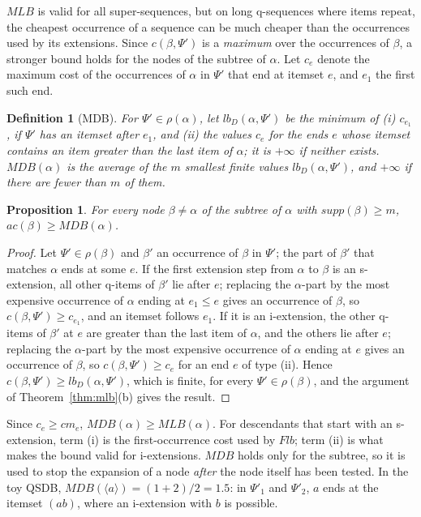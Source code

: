 \documentclass[pdflatex,sn-mathphys,Numbered]{sn-jnl}
\theoremstyle{thmstyleone}
\newtheorem{proposition}[theorem]{Proposition}
\theoremstyle{thmstyletwo}
\theoremstyle{thmstylethree}
\newtheorem{definition}{Definition}
\newcommand{\flb}{\ensuremath{\mathit{Flb}}}
\newcommand{\mlb}{\ensuremath{\mathit{MLB}}}
\newcommand{\mdb}{\ensuremath{\mathit{MDB}}}
\newcommand{\supp}{\ensuremath{\mathit{supp}}}
\newcommand{\ac}{\ensuremath{\mathit{ac}}}
\newcommand{\seq}[1]{\langle #1\rangle}
\begin{document}
\mlb{} is valid for all super-sequences, but on long q-sequences where items repeat, the
cheapest occurrence of a sequence can be much cheaper than the occurrences used by its
extensions. Since $c(\beta,\Psi')$ is a \emph{maximum} over the occurrences of $\beta$, a
stronger bound holds for the nodes of the subtree of $\alpha$. Let $c_e$ denote the maximum
cost of the occurrences of $\alpha$ in $\Psi'$ that end at itemset $e$, and $e_1$ the first such
end.

\begin{definition}[MDB]
For $\Psi' \in \rho(\alpha)$, let $\mathit{lb}_D(\alpha,\Psi')$ be the minimum of (i) $c_{e_1}$, if
$\Psi'$ has an itemset after $e_1$, and (ii) the values $c_e$ for the ends $e$ whose itemset
contains an item greater than the last item of $\alpha$; it is $+\infty$ if neither exists.
$\mdb(\alpha)$ is the average of the $m$ smallest finite values $\mathit{lb}_D(\alpha,\Psi')$,
and $+\infty$ if there are fewer than $m$ of them.
\end{definition}

\begin{proposition}\label{prop:mdb}
For every node $\beta \ne \alpha$ of the subtree of $\alpha$ with $\supp(\beta) \ge m$,
$\ac(\beta) \ge \mdb(\alpha)$.
\end{proposition}
\begin{proof}
Let $\Psi' \in \rho(\beta)$ and $\beta'$ an occurrence of $\beta$ in $\Psi'$; the part of $\beta'$
that matches $\alpha$ ends at some $e$. If the first extension step from $\alpha$ to $\beta$ is an
s-extension, all other q-items of $\beta'$ lie after $e$; replacing the $\alpha$-part by the most
expensive occurrence of $\alpha$ ending at $e_1 \le e$ gives an occurrence of $\beta$, so
$c(\beta,\Psi') \ge c_{e_1}$, and an itemset follows $e_1$. If it is an i-extension, the other
q-items of $\beta'$ at $e$ are greater than the last item of $\alpha$, and the others lie after
$e$; replacing the $\alpha$-part by the most expensive occurrence of $\alpha$ ending at $e$ gives
an occurrence of $\beta$, so $c(\beta,\Psi') \ge c_e$ for an end $e$ of type (ii). Hence
$c(\beta,\Psi') \ge \mathit{lb}_D(\alpha,\Psi')$, which is finite, for every $\Psi' \in
\rho(\beta)$, and the argument of Theorem~\ref{thm:mlb}(b) gives the result.
\end{proof}

Since $c_e \ge \mathit{cm}_e$, $\mdb(\alpha) \ge \mlb(\alpha)$. For descendants that start with an
s-extension, term (i) is the first-occurrence cost used by \flb{}; term (ii) is what makes the
bound valid for i-extensions. \mdb{} holds only for the subtree, so it is used to stop the
expansion of a node \emph{after} the node itself has been tested. In the toy QSDB,
$\mdb(\seq{a}) = (1 + 2)/2 = 1.5$: in $\Psi'_1$ and $\Psi'_2$, $a$ ends at the itemset $(ab)$,
where an i-extension with $b$ is possible.
\end{document}
